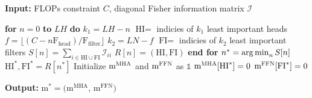 \setlength{\textfloatsep}{6pt}
\begin{algorithm}[tb]
   \caption{Mask Search with a FLOPs Constraint}
   \label{alg:search_flops}
   
    {\bfseries Input:} FLOPs constraint $C$, diagonal Fisher information matrix $\mathcal{I}$
   
\begin{algorithmic}[1]
    \STATE \textbf{for} {$n=0$ {\bfseries to} $LH$} \textbf{do} \label{alg:search_flops:for} 
    \hspace*{\fill}{$\triangleright$ \# remaining heads}
        \STATE \quad  $k_1 = LH - n$ \hspace*{\fill}{$\triangleright$ \# heads to prune}
        \STATE \quad $\text{HI} = $ indicies of $k_1$ least important heads
        \STATE \quad $f = \lfloor (C - n \text{F}_{\text{head}}) / \text{F}_\text{filter} \rfloor $ \label{alg:search_flops:num_filters}
        \hspace*{\fill}{$\triangleright$ \# remaining filters}
        \STATE \quad $k_2 = LN - f$
        \hspace*{\fill}{$\triangleright$ \# filters to prune}
        \STATE \quad $\text{FI} = $ indicies of $k_2$ least important filters
        \STATE \quad $S[n] = \sum_{i \in \text{HI} \cup \text{FI}} \mathcal{I}_{ii}$
        \STATE \quad $R[n] = (\text{HI}, \text{FI})$
    \STATE \textbf{end for}
    \STATE $n^\ast = \operatorname*{arg\,min}_n S[n]$
    \hspace*{\fill}{$\triangleright$ optimal \# remaining heads} \label{alg:search_flops:argmin_s}
    \STATE $\text{HI}^\ast, \text{FI}^\ast = R[n^\ast]$ \label{alg:search_flops:r_n}
    \hspace*{\fill}{$\triangleright$ indicies of heads/filters to prune}
    \STATE Initialize $\text{m}^{\textsc{MHA}}$ and $\text{m}^{\textsc{FFN}}$ as $\mathbb{1}$
    \STATE $\text{m}^{\textsc{MHA}}[\text{HI}^\ast] = 0$ \hspace*{\fill}{$\triangleright$ prune the selected heads}
    \STATE $\text{m}^{\textsc{FFN}}[\text{FI}^\ast] = 0$ \hspace*{\fill}{$\triangleright$ prune the selected filters}
\end{algorithmic}

     {\bfseries Output:} $\text{m}^\ast = (\text{m}^{\textrm{MHA}}$, $\text{m}^{\textrm{FFN}})$
\end{algorithm}

